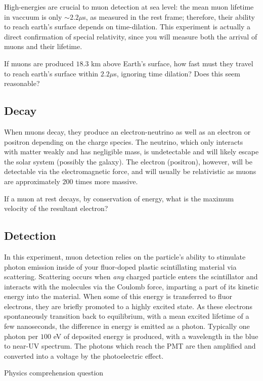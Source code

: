\documentclass[aps,prb,groupedaddress,notitlepage,nofootinbib]{revtex4-1} %
\begin{document}
High-energies are crucial to muon detection at sea level: the mean muon lifetime in vaccuum is only $\sim 2.2 \mu $s, as measured in the rest frame; therefore, their ability to reach earth's surface depends on time-dilation. This experiment is actually a direct confirmation of special relativity, since you will measure both the arrival of muons and their lifetime.
\begin{QQP}[]
{ If muons are produced $18.3$ km above Earth's surface, how fast must they travel to reach earth's surface within $2.2 \mu $s, ignoring time dilation? Does this seem reasonable? }
\end{QQP}
\subsection{Decay}
When muons decay, they produce an electron-neutrino as well as an electron or positron depending on the charge species. The neutrino, which only interacts with matter weakly and has negligible mass, is undetectable and will likely escape the solar system (possibly the galaxy). The electron (positron), however, will be detectable via the electromagnetic force, and will usually be relativistic as muons are approximately $200$ times more massive.

\begin{QQP}[]
{ If a muon at rest decays, by conservation of energy, what is the maximum velocity of the resultant electron?  }
\end{QQP}

\subsection{Detection}
In this experiment, muon detection relies on the particle's ability to stimulate photon emission inside of your fluor-doped plastic scintillating material via scattering. Scattering occurs when \textit{any} charged particle enters the scintillator and interacts with the molecules via the Coulomb force, imparting a part of its kinetic energy into the material. When some of this energy is transferred to fluor electrons, they are briefly promoted to a highly excited state. As these electrons spontaneously transition back to equilibrium, with a mean excited lifetime of a few nanoseconds, the difference in energy is emitted as a photon. Typically one photon per $100$ eV of deposited energy is produced, with a wavelength in the blue to near-UV spectrum. The photons which reach the PMT are then amplified and converted into a voltage by the photoelectric effect.
\begin{QQP}[]
{ Physics comprehension question }
\end{QQP}
\end{document}
